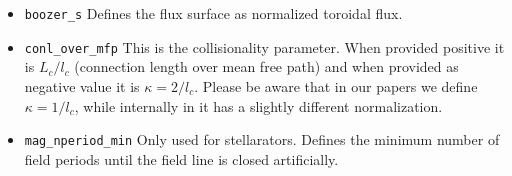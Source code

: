 \documentclass{article}
\newcommand{\vv}[1]{\texttt{\detokenize{#1}}}
\begin{document}
\begin{itemize}
 \item \verb|boozer_s| \newline
 Defines the flux surface as normalized toroidal flux.
 \item \verb|conl_over_mfp|\newline
 This is the collisionality parameter. When provided positive it is
 $L_c/l_c$ (connection length over mean free path) and when provided as
 negative value it is $\kappa = 2/l_c$. Please be aware that in our
 papers we define $\kappa = 1/l_c$, while internally in \vv{NEO-2} it has a
 slightly different normalization.
 \item \verb|mag_nperiod_min|\newline
 Only used for stellarators. Defines the minimum number of field periods
 until the field line is closed artificially.
\end{itemize}
\end{document}
